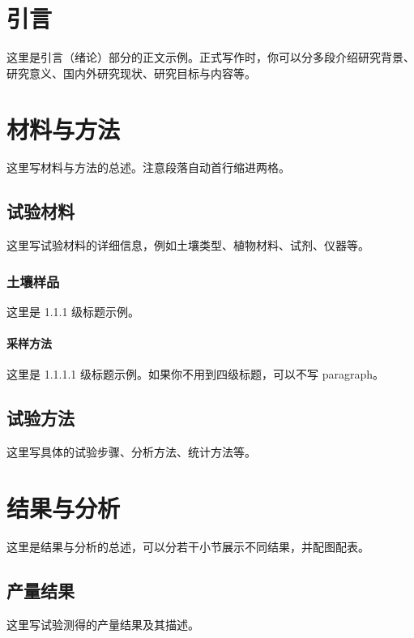 \documentclass[UTF8,oneside]{ctexrep} %
\newenvironment{maintext}{%
	\zihao{5}%
	\songti
	\setlength{\parindent}{2em}%
	\setlength{\baselineskip}{20pt}%
}{}
\begin{document}
	\begin{maintext}
		
		\section*{引言}
		
		这里是引言（绪论）部分的正文示例。正式写作时，你可以分多段介绍研究背景、研究意义、国内外研究现状、研究目标与内容等。
		
		\section{材料与方法}
		
		这里写材料与方法的总述。注意段落自动首行缩进两格。
		
		\subsection{试验材料}
		这里写试验材料的详细信息，例如土壤类型、植物材料、试剂、仪器等。
		
		\subsubsection{土壤样品}
		这里是 1.1.1 级标题示例。
		
		\paragraph{采样方法}
		这里是 1.1.1.1 级标题示例。如果你不用到四级标题，可以不写 paragraph。
		
		\subsection{试验方法}
		这里写具体的试验步骤、分析方法、统计方法等。
		
		\section{结果与分析}
		
		这里是结果与分析的总述，可以分若干小节展示不同结果，并配图配表。
		
		\subsection{产量结果}
		这里写试验测得的产量结果及其描述。
		

\end{maintext}
\end{document}
